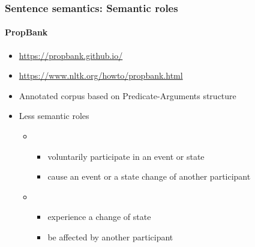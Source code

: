 \documentclass[xcolor=table]{beamer}
\begin{document}
\begin{frame}
\frametitle{Sentence semantics: Semantic roles}
\framesubtitle{PropBank}

	
\begin{itemize}
	\item {\scriptsize \url{https://propbank.github.io/}}
	\item {\scriptsize \url{https://www.nltk.org/howto/propbank.html}}
	\item Annotated corpus based on Predicate-Arguments structure
	\item Less semantic roles 
	\begin{itemize}
		\item {}
		\begin{itemize}
			\item voluntarily participate in an event or state
			\item cause an event or a state change of another participant
		\end{itemize}
		\item {}
		\begin{itemize}
			\item experience a change of state
			\item be affected by another participant
		\end{itemize}
	\end{itemize}
\end{itemize}
	
\end{frame}
\end{document}
